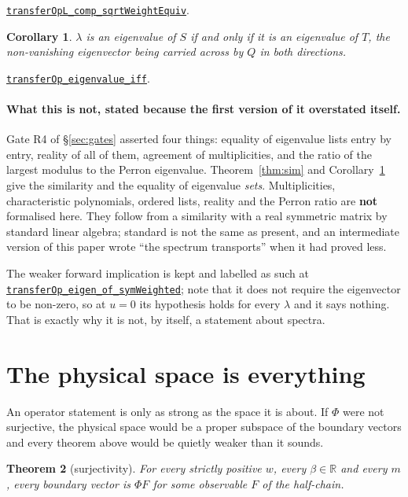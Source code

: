 \documentclass[11pt]{article}
\newtheorem{theorem}{Theorem}[section]
\newtheorem{corollary}[theorem]{Corollary}
\theoremstyle{definition}
\newcommand{\anchor}{c90dc745ab8cd1ba7ddc02aa16fed3de339bf958}
\newcommand{\osline}[3]{%
  \href{https://github.com/lluiseriksson/THE-ERIKSSON-PROGRAMME/blob/\anchor/YangMills/OS/#1.lean\#L#2}{\nolinkurl{#3}}}
\newcommand{\R}{\mathbb{R}}
\begin{document}
\osline{SpatialReconstruction}{SIMILARLINE}{transferOpL\_comp\_sqrtWeightEquiv}.

\begin{corollary}\label{cor:eig}
$\lambda$ is an eigenvalue of $S$ if and only if it is an eigenvalue of $T$, the
non-vanishing eigenvector being carried across by $Q$ in both directions.
\end{corollary}

\osline{SpatialReconstruction}{EIGIFFLINE}{transferOp\_eigenvalue\_iff}.

\paragraph{What this is not, stated because the first version of it overstated
itself.}  Gate R4 of \S\ref{sec:gates} asserted four things: equality of
eigenvalue lists entry by entry, reality of all of them, agreement of
multiplicities, and the ratio of the largest modulus to the Perron eigenvalue.
Theorem~\ref{thm:sim} and Corollary~\ref{cor:eig} give the similarity and the
equality of eigenvalue \emph{sets}.  Multiplicities, characteristic
polynomials, ordered lists, reality and the Perron ratio are \textbf{not}
formalised here.  They follow from a similarity with a real symmetric matrix by
standard linear algebra; standard is not the same as present, and an
intermediate version of this paper wrote ``the spectrum transports'' when it had
proved less.

The weaker forward implication is kept and labelled as such at
\osline{SpatialReconstruction}{FWDEIGLINE}{transferOp\_eigen\_of\_symWeighted};
note that it does not require the eigenvector to be non-zero, so at $u=0$ its
hypothesis holds for every $\lambda$ and it says nothing.  That is exactly why
it is not, by itself, a statement about spectra.

\section{The physical space is everything}\label{sec:phys}

An operator statement is only as strong as the space it is about.  If $\Phi$
were not surjective, the physical space would be a proper subspace of the
boundary vectors and every theorem above would be quietly weaker than it sounds.

\begin{theorem}[surjectivity]\label{thm:surj}
For every strictly positive $w$, every $\beta\in\R$ and every $m$, every
boundary vector is $\Phi F$ for some observable $F$ of the half-chain.
\end{theorem}
\end{document}
